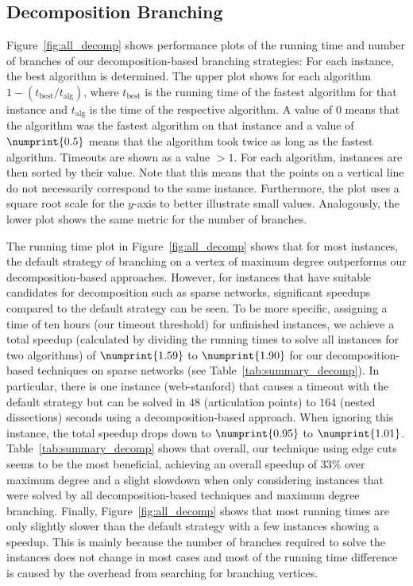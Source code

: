 \documentclass[a4paper,UKenglish,cleveref, autoref, thm-restate]{lipics-v2021}
\begin{document}
\subsection{Decomposition Branching}\label{sec:experiments_decomp}

Figure~\ref{fig:all_decomp} shows performance plots of the running time and
number of branches of
our decomposition-based branching strategies: For each instance, the best
algorithm is determined. The upper plot shows for each algorithm $1 - (t_{\text{best}}/
t_{\text{alg}})$, where $t_{\text{best}}$ is the running time of the fastest algorithm
for that instance and $t_{\text{alg}}$ is the time of the respective algorithm.
A value of $0$ means that
the algorithm was the fastest algorithm on that instance and a value of
$\numprint{0.5}$ means that the algorithm took twice as long as the fastest
algorithm. Timeouts are shown as a value $> 1$. For each algorithm, instances
are then sorted by their value. Note that this means that the points on a
vertical line do not necessarily correspond to the same instance. Furthermore,
the plot uses a square root scale for the $y$-axis to better illustrate small values.
Analogously, the lower plot shows the same metric for the number of
branches.

The running time plot in Figure~\ref{fig:all_decomp} shows that for most instances, the default strategy of branching on a
vertex of maximum degree outperforms our decomposition-based approaches.
However, for instances that have suitable candidates for decomposition such as
sparse networks, significant speedups compared to the default strategy can be
seen. To be more specific, assigning a time of ten hours (our timeout threshold) for unfinished
instances, we achieve a total speedup (calculated by dividing the running times
to solve all instances for two algorithms) of $\numprint{1.59}$ to $\numprint{1.90}$ for our
decomposition-based techniques on sparse networks (see
Table~\ref{tab:summary_decomp}). In particular, there is one instance (web-stanford) that causes a timeout with the
default strategy but can be solved in $48$ (articulation points) to $164$ (nested
dissections) seconds using a decomposition-based approach. When ignoring this instance, the total speedup drops down
to $\numprint{0.95}$ to $\numprint{1.01}$. Table~\ref{tab:summary_decomp} shows that overall, our
technique using edge cuts seems to be the most beneficial, achieving an overall
speedup of $33\%$ over maximum degree and a slight slowdown
when only considering instances that were solved by all decomposition-based
techniques and maximum degree branching.
Finally, Figure~\ref{fig:all_decomp} shows that most running
times are only slightly slower than the default strategy with a few instances
showing a speedup. This is mainly because
the number of branches required to solve the instances does not change in most
cases and most of the running time
difference is caused by the overhead from
searching for branching vertices.%
\end{document}

